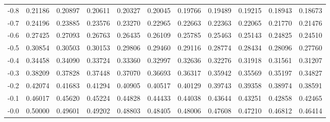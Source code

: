 \documentclass{article}
\begin{document}
\begin{center}
\begin{tabular}{*{11}{M{12.9mm}}}
-0.8 & 0.21186 & 0.20897 & 0.20611 & 0.20327 & 0.20045 & 0.19766 & 0.19489 & 0.19215 & 0.18943 & 0.18673\\
-0.7 & 0.24196 & 0.23885 & 0.23576 & 0.23270 & 0.22965 & 0.22663 & 0.22363 & 0.22065 & 0.21770 & 0.21476\\
-0.6 & 0.27425 & 0.27093 & 0.26763 & 0.26435 & 0.26109 & 0.25785 & 0.25463 & 0.25143 & 0.24825 & 0.24510\\
-0.5 & 0.30854 & 0.30503 & 0.30153 & 0.29806 & 0.29460 & 0.29116 & 0.28774 & 0.28434 & 0.28096 & 0.27760\\
-0.4 & 0.34458 & 0.34090 & 0.33724 & 0.33360 & 0.32997 & 0.32636 & 0.32276 & 0.31918 & 0.31561 & 0.31207\\
-0.3 & 0.38209 & 0.37828 & 0.37448 & 0.37070 & 0.36693 & 0.36317 & 0.35942 & 0.35569 & 0.35197 & 0.34827\\
-0.2 & 0.42074 & 0.41683 & 0.41294 & 0.40905 & 0.40517 & 0.40129 & 0.39743 & 0.39358 & 0.38974 & 0.38591\\
-0.1 & 0.46017 & 0.45620 & 0.45224 & 0.44828 & 0.44433 & 0.44038 & 0.43644 & 0.43251 & 0.42858 & 0.42465\\
-0.0 & 0.50000 & 0.49601 & 0.49202 & 0.48803 & 0.48405 & 0.48006 & 0.47608 & 0.47210 & 0.46812 & 0.46414\\
\bottomrule
    \end{tabular}
  \end{center}
    \pagebreak
\end{document}
